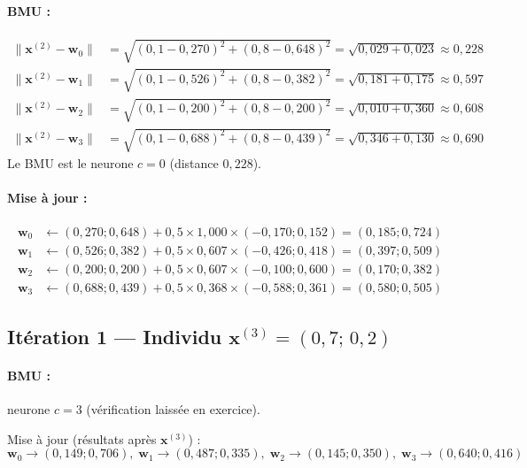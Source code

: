 \documentclass[a4paper,11pt]{article}
\theoremstyle{definition}
\begin{document}
\paragraph{BMU :}
\begin{align*}
\|\mathbf{x}^{(2)} - \mathbf{w}_0\| &= \sqrt{(0{,}1-0{,}270)^2 + (0{,}8-0{,}648)^2} = \sqrt{0{,}029+0{,}023} \approx 0{,}228 \\
\|\mathbf{x}^{(2)} - \mathbf{w}_1\| &= \sqrt{(0{,}1-0{,}526)^2 + (0{,}8-0{,}382)^2} = \sqrt{0{,}181+0{,}175} \approx 0{,}597 \\
\|\mathbf{x}^{(2)} - \mathbf{w}_2\| &= \sqrt{(0{,}1-0{,}200)^2 + (0{,}8-0{,}200)^2} = \sqrt{0{,}010+0{,}360} \approx 0{,}608 \\
\|\mathbf{x}^{(2)} - \mathbf{w}_3\| &= \sqrt{(0{,}1-0{,}688)^2 + (0{,}8-0{,}439)^2} = \sqrt{0{,}346+0{,}130} \approx 0{,}690
\end{align*}
Le BMU est le neurone $c = 0$ (distance $0{,}228$).

\paragraph{Mise à jour :}
\begin{align*}
\mathbf{w}_0 &\leftarrow (0{,}270;0{,}648) + 0{,}5\times1{,}000\times(-0{,}170;0{,}152) = (0{,}185;0{,}724) \\
\mathbf{w}_1 &\leftarrow (0{,}526;0{,}382) + 0{,}5\times0{,}607\times(-0{,}426;0{,}418) = (0{,}397;0{,}509) \\
\mathbf{w}_2 &\leftarrow (0{,}200;0{,}200) + 0{,}5\times0{,}607\times(-0{,}100;0{,}600) = (0{,}170;0{,}382) \\
\mathbf{w}_3 &\leftarrow (0{,}688;0{,}439) + 0{,}5\times0{,}368\times(-0{,}588;0{,}361) = (0{,}580;0{,}505)
\end{align*}

\subsection{Itération 1 — Individu $\mathbf{x}^{(3)} = (0{,}7;\,0{,}2)$}

\paragraph{BMU :} neurone $c = 3$ (vérification laissée en exercice).

Mise à jour (résultats après $\mathbf{x}^{(3)}$) :
\[
\mathbf{w}_0 \to (0{,}149;0{,}706),\;
\mathbf{w}_1 \to (0{,}487;0{,}335),\;
\mathbf{w}_2 \to (0{,}145;0{,}350),\;
\mathbf{w}_3 \to (0{,}640;0{,}416)
\]
\end{document}
